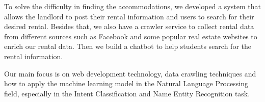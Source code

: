 To solve the difficulty in finding the accommodations, we developed a system that allows the landlord to post their rental information and users to search for their desired rental. Besides that, we also have a crawler service to collect rental data from different sources such as Facebook and some popular real estate websites to enrich our rental data. Then we build a chatbot to help students search for the rental information.

\noindent Our main focus is on web development technology, data crawling techniques and how to apply the machine learning model in the Natural Language Processing field, especially in the Intent Classification and Name Entity Recognition task.